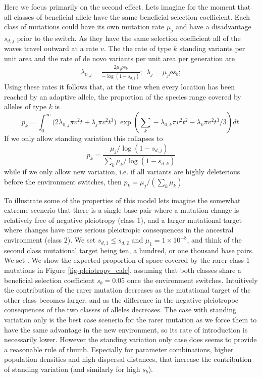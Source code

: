 \documentclass{article}
\begin{document}
Here we focus primarily on the second effect. 
Lets imagine for the moment that all classes of beneficial allele have
the same beneficial selection coefficient. 
Each class of mutations could have its own mutation rate $\mu_j$ and
have a disadvantage $s_{d,j}$ prior to the switch. As they have the
same selection coefficient all of the waves travel outward at a rate
$v$. 
The the rate of type $k$ standing variants per unit area and the rate of de
novo variants per unit area per generation are
\begin{align}
    \lambda_{0,j} = \frac{ 2 \mu_j \rho s_b }{ -\log(1-s_{d,j}) } ; ~~      \lambda_{j} = \mu_j \rho s_b;
\end{align}
Using these rates it follows that, at the time when every location has been reached by an adaptive allele,
the proportion of the species range covered by alleles of type $k$ is
\begin{equation} \label{eqn-prop-space-allele-k}
    p_k = \int_0^\infty  \big( 2 \lambda_{0,j} \pi v^2 t + \lambda_j
    \pi v^2 t^3 \big)  \; \exp \left(\sum_k - \lambda_{0,k} \pi v^2 t^2 - \lambda_k \pi v^2 t^3 / 3 \right) dt .
\end{equation}
If we only allow standing variation this collapses to 
\begin{equation}  \label{eqn-prop-space-allele-k-standing-room-only}
    p_k = \frac{  \mu_j / \log(1-s_{d,j}) }{\sum_k  \mu_k / \log(1-s_{d,k}) }
\end{equation}
while if we only allow new variation, i.e. if all variants are highly
deleterious before the environment switches, then $p_k =\mu_j / (\sum_k  \mu_k)$

To illustrate some of the properties of this model lets imagine the
somewhat extreme scenerio that there is a single base-pair where
a mutation change is relatively free of negative pleiotropy (class $1$), and a
larger mutational target where changes have more serious pleiotropic
consequences in the ancestral environment (class $2$). We set $s_{d,1}
\leq s_{d,2}$ and $\mu_1=1 \times 10^{-8}$, and think of the second
class mutational target being ten, a hundred, or one thousand base
pairs. We set  . We show the expected proportion of space covered by
the rarer class $1$ mutations in Figure \ref{fig-pleiotropy_calc},
assuming that both classes share a beneficial selection coefficient
$s_b=0.05$ once the environment switches. 
Intuitively the contribution of the rarer mutation decreases as the
mutational target of the other class becomes larger, and as the
difference in the negative pleiotropoc consequences of the two classes
of alleles decreases. The case with standing variation only is the best
case scenerio for the rarer mutation as we force them to have the same
advantage in the new environment, so its rate of introduction is
necessarily lower. However the standing variation only case does seems
to provide a reasonable rule of thumb. Especially for parameter combinations, higher population densities and
high dispersal distances, that increase the contribution of standing
variation (and similarly for high $s_b$). 
\end{document}
